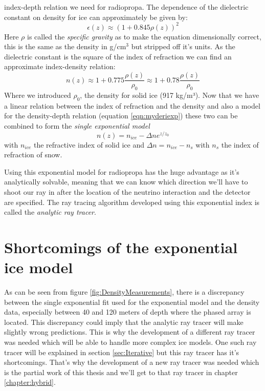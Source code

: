 index-depth relation we need for radiopropa.  The dependence of the dielectric
constant on density for ice can approximately be given by\cite{Robin}:
\begin{equation} 
	\epsilon(z) \approx (1 + 0.845\rho(z))^2 
\end{equation} 
Here $\rho$ is called the \textit{specific gravity} as to make the equation
dimensionally correct, this is the same as the density in g/cm$^3$ but stripped
off it's units.  As the dielectric constant is the square of the index of
refraction we can find an approximate index-density relation:
\begin{equation} 
	n(z) \approx 1 + 0.775\frac{\rho(z)}{\rho_0} \approx 1 + 0.78\frac{\rho(z)}{\rho_0} \label{eqn:Schytt}
\end{equation} 
Where we introduced $\rho_0$, the density for solid ice (917 kg/m³).  
Now that we have a linear relation between the index of refraction and the density
and also a model for the density-depth relation (equation \ref{eqn:myderiexp}) these two can
be combined to form the \textit{single exponential model}
\begin{equation}
	\label{eqn:expn}
	n(z) = n_{ice} - \Delta n e^{z/z_0}
\end{equation}
with $n_{ice}$ the refractive index of solid ice and $\Delta n = n_{ice} - n_s$
with $n_s$ the index of refraction of snow. 

Using this exponential model for radiopropa has the huge advantage as it's
analytically solvable, meaning that we can know which direction we'll have to
shoot our ray in after the location of the neutrino interaction and the
detector are specified. The ray tracing algorithm developed using this
exponential index is called the \textit{analytic ray tracer}.

\section{Shortcomings of the exponential ice model}
As can be seen from figure \ref{fig:DensityMeasurements}, there is a
discrepancy between the single exponential fit used for the exponential model
and the density data, especially between 40 and 120 meters of depth where the
phased array is located.  This discrepancy could imply that the analytic ray tracer will
make slightly wrong predictions.  This is why the development of a different
ray tracer was needed which will be able to handle more complex ice models. One
such ray tracer will be explained in section \ref{sec:Iterative} but this ray
tracer has it's shortcomings. That's why the development of a new ray tracer
was needed which is the partial work of this thesis and we'll get to that ray
tracer in chapter \ref{chapter:hybrid}.

